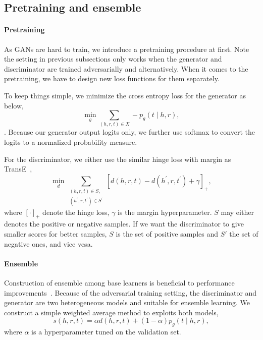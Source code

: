 \documentclass[twocolumn,a4paper,10pt,preprint,3p]{elsarticle}
\begin{document}
\subsection{Pretraining and ensemble}

\paragraph{Pretraining} As GANs are hard to train, we introduce a pretraining procedure at first. Note the setting in previous subsections only works when the generator and discriminator are trained adversarially and alternatively. When it comes to the pretraining, we have to design new loss functions for them separately.

To keep things simple, we minimize the cross entropy loss for the generator as below,
\begin{equation}
    \min_g \sum_{(h, r, t)\in X} -p_g(t \mid h, r), \label{eq:g_pretrain}
\end{equation}.
Because our generator output logits only, we further use softmax to convert the logits to a normalized probability measure.

For the discriminator, we either use the similar hinge loss with margin as TransE~\cite{TransE2013},
\begin{equation}
    \min_d \sum_{\substack{(h, r, t)\in S,\\ (h^\prime, r, t^\prime)\in S^\prime }}
        {[ d(h, r, t) - d(h^\prime, r, t^\prime) + \gamma ]}_+, \label{eq:d_pretrain}
\end{equation}
where ${[\cdot]}_+$ denote the hinge loss, $\gamma$ is the margin hyperparameter. $S$ may either denotes the positive or negative samples. If we want the discriminator to give smaller scores for better samples, $S$ is the set of positive samples and $S'$ the set of negative ones, and vice vesa.

\paragraph{Ensemble} Construction of ensemble among base learners is beneficial to performance improvements~\cite{dietterich2000ensemble}. Because of the adversarial training setting, the discriminator and generator are two heterogeneous models and suitable for ensemble learning. We construct a simple weighted average method to exploits both models,
\begin{equation}
    s(h, r, t) = \alpha d(h, r, t) + (1 - \alpha) p_g(t \mid h, r), \label{eq:weighted-ensemble}
\end{equation}
where $\alpha$ is a hyperparameter tuned on the validation set.
\end{document}
